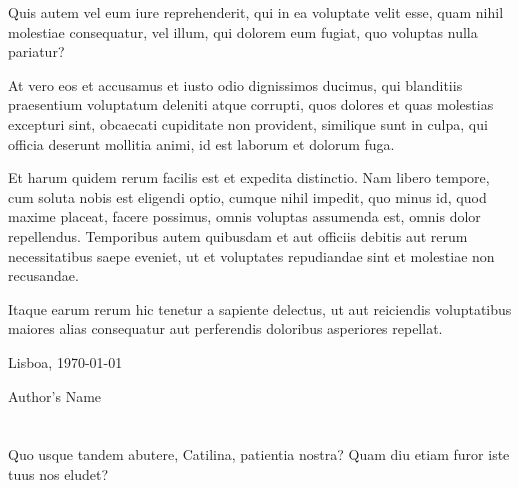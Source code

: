 Quis autem vel eum iure reprehenderit, qui in ea voluptate velit esse, quam nihil molestiae consequatur, vel illum, qui dolorem eum fugiat, quo voluptas nulla pariatur?

At vero eos et accusamus et iusto odio dignissimos ducimus, qui blanditiis praesentium voluptatum deleniti atque corrupti, quos dolores et quas molestias excepturi sint, obcaecati cupiditate non provident, similique sunt in culpa, qui officia deserunt mollitia animi, id est laborum et dolorum fuga.

Et harum quidem rerum facilis est et expedita distinctio. Nam libero tempore, cum soluta nobis est eligendi optio, cumque nihil impedit, quo minus id, quod maxime placeat, facere possimus, omnis voluptas assumenda est, omnis dolor repellendus. Temporibus autem quibusdam et aut officiis debitis aut rerum necessitatibus saepe eveniet, ut et voluptates repudiandae sint et molestiae non recusandae.

Itaque earum rerum hic tenetur a sapiente delectus, ut aut reiciendis voluptatibus maiores alias consequatur aut perferendis doloribus asperiores repellat.

\vfill
\begin{flushright}
  \begin{minipage}{8cm}
    \begin{center}
      Lisboa, \today

      Author's Name
    \end{center}
  \end{minipage}
\end{flushright}

\cleardoublepage


\chapter*{}
\thispagestyle{empty}

\vfill
\mbox{}
\vfill\Large
\begin{flushright}
  \begin{minipage}{8cm}
    \begin{center}

Quo usque tandem abutere, Catilina, patientia nostra? Quam diu etiam furor iste tuus nos eludet?

    \end{center}
  \end{minipage}
\end{flushright}
\normalsize\vfill

